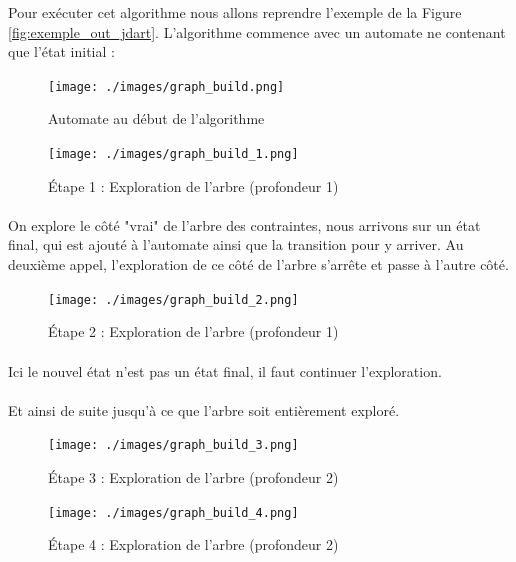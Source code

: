 Pour exécuter cet algorithme nous allons reprendre l'exemple de la Figure 
\ref{fig:exemple_out_jdart}. L'algorithme commence avec un automate ne 
contenant que l'état initial :

\begin{figure}[H]
 \centering
 \texttt{[image: ./images/graph\_build.png]}
 \caption{Automate au début de l'algorithme}
\end{figure}


 
 \begin{figure}[H]
  \centering
  \texttt{[image: ./images/graph\_build\_1.png]}
  \caption{Étape 1 : Exploration de l'arbre (profondeur 1)}
 \end{figure}

 \paragraph{} On explore le côté "vrai" de l'arbre des contraintes, nous 
arrivons sur un état final, qui est 
ajouté à l'automate ainsi que la transition pour y arriver. Au deuxième appel, 
l'exploration de ce côté de l'arbre s'arrête et passe à l'autre côté.


 \begin{figure}[H]
  \centering
  \texttt{[image: ./images/graph\_build\_2.png]}
  \caption{Étape 2 : Exploration de l'arbre (profondeur 1)}
 \end{figure}
 \paragraph{} Ici le nouvel état n'est pas un état final, il faut continuer 
l'exploration.
 \paragraph{} Et ainsi de suite jusqu'à ce que l'arbre soit 
entièrement exploré.


 \begin{figure}[H]
  \centering
  \texttt{[image: ./images/graph\_build\_3.png]}
  \caption{Étape 3 : Exploration de l'arbre (profondeur 2)}
 \end{figure}

\begin{figure}[H]
  \centering
  \texttt{[image: ./images/graph\_build\_4.png]}
  \caption{Étape 4 : Exploration de l'arbre (profondeur 2)}
  \label{fig:automate_construit}
 \end{figure}


